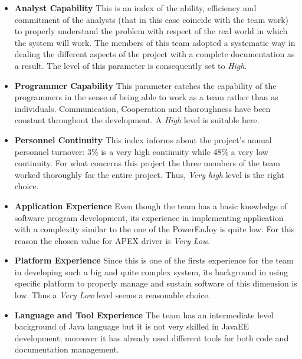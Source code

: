 \documentclass[11pt,a4paper]{report}
\begin{document}
\begin{itemize}
	\item \textbf{Analyst Capability}
This is an index of the ability, efficiency and commitment of the analysts (that in this case coincide with the team work) to properly understand the problem with respect of the real world in which the system will work. The members of this team adopted a systematic way in dealing the different aspects of the project with a complete documentation as a result. The level of this parameter is consequently set to \textit{High}. 
\newpage
	\item \textbf{Programmer Capability}
This parameter catches the capability of the programmers in the sense of being able to work as a team rather than as individuals. Communication,  Cooperation and thoroughness have been constant throughout the development. A \textit{High} level is suitable here.
	\item \textbf{Personnel Continuity}
This index informs about the project's annual personnel turnover: 3\% is a very high continuity while 48\% a very low continuity. For what concerns this project the three members of the team worked thoroughly for the entire project. Thus, \textit{Very high} level is the right choice. 
	\item \textbf{Application Experience}
Even though the team has a basic knowledge of software program development, its experience in implementing application with a complexity similar to the one of the PowerEnJoy is quite low. For this reason the chosen value for APEX driver is \textit{Very Low}.
	\item \textbf{Platform Experience}
Since this is one of the firsts experience for the team in developing such a big and quite complex system, its background in using specific platform to properly manage and sustain software of this dimension is low. Thus a \textit{Very Low} level seems a reasonable choice.
	\item \textbf{Language and Tool Experience}
The team has an intermediate level background of Java language but it is not very skilled in JavaEE development; moreover it has already used different tools for both code and documentation management.

\end{itemize}
\end{document}
